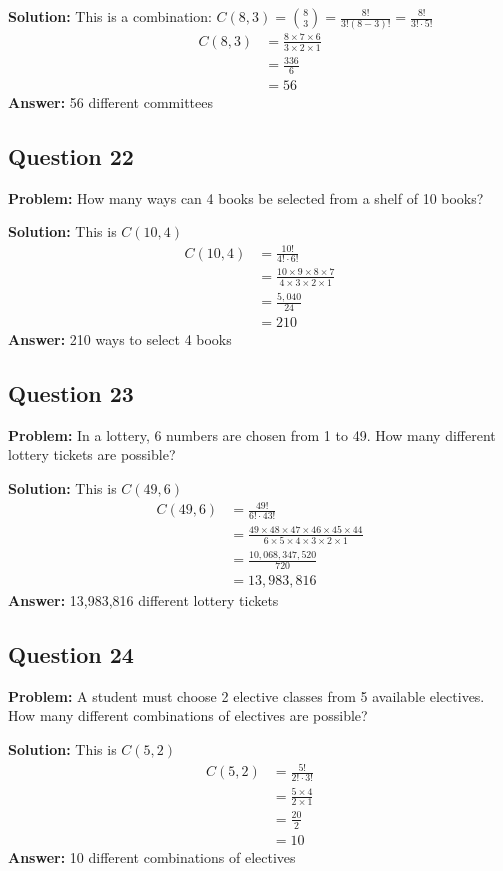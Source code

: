 \documentclass[12pt]{article}
\begin{document}
\textbf{Solution:} This is a combination: $C(8,3) = \binom{8}{3} = \frac{8!}{3!(8-3)!} = \frac{8!}{3! \cdot 5!}$
\begin{align*}
C(8,3) &= \frac{8 \times 7 \times 6}{3 \times 2 \times 1} \\
&= \frac{336}{6} \\
&= 56
\end{align*}
\textbf{Answer:} 56 different committees

\subsection*{Question 22}
\textbf{Problem:} How many ways can 4 books be selected from a shelf of 10 books?

\textbf{Solution:} This is $C(10,4)$
\begin{align*}
C(10,4) &= \frac{10!}{4! \cdot 6!} \\
&= \frac{10 \times 9 \times 8 \times 7}{4 \times 3 \times 2 \times 1} \\
&= \frac{5{,}040}{24} \\
&= 210
\end{align*}
\textbf{Answer:} 210 ways to select 4 books

\subsection*{Question 23}
\textbf{Problem:} In a lottery, 6 numbers are chosen from 1 to 49. How many different lottery tickets are possible?

\textbf{Solution:} This is $C(49,6)$
\begin{align*}
C(49,6) &= \frac{49!}{6! \cdot 43!} \\
&= \frac{49 \times 48 \times 47 \times 46 \times 45 \times 44}{6 \times 5 \times 4 \times 3 \times 2 \times 1} \\
&= \frac{10{,}068{,}347{,}520}{720} \\
&= 13{,}983{,}816
\end{align*}
\textbf{Answer:} 13,983,816 different lottery tickets

\subsection*{Question 24}
\textbf{Problem:} A student must choose 2 elective classes from 5 available electives. How many different combinations of electives are possible?

\textbf{Solution:} This is $C(5,2)$
\begin{align*}
C(5,2) &= \frac{5!}{2! \cdot 3!} \\
&= \frac{5 \times 4}{2 \times 1} \\
&= \frac{20}{2} \\
&= 10
\end{align*}
\textbf{Answer:} 10 different combinations of electives
\end{document}
